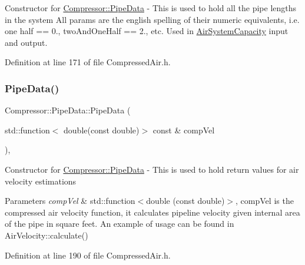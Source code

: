 Constructor for \hyperlink{struct_compressor_1_1_pipe_data}{Compressor\+::\+Pipe\+Data} -\/ This is used to hold all the pipe lengths in the system All params are the english spelling of their numeric equivalents, i.\+e. one half == 0., two\+And\+One\+Half == 2., etc. Used in \hyperlink{class_compressor_1_1_air_system_capacity}{Air\+System\+Capacity} input and output. 

Definition at line 171 of file Compressed\+Air.\+h.

\mbox{\label{struct_compressor_1_1_pipe_data_af7998fd533340b0a84e78fcda91b4806}} 
\subsubsection{\texorpdfstring{Pipe\+Data()}{PipeData()}\hspace{0.1cm}{\footnotesize\ttfamily [2/6]}}
{\footnotesize\ttfamily Compressor\+::\+Pipe\+Data\+::\+Pipe\+Data (\begin{DoxyParamCaption}\item[{std\+::function$<$ double(const double)$>$ const \&}]{comp\+Vel }\end{DoxyParamCaption})\hspace{0.3cm}{\ttfamily [inline]}, {\ttfamily [explicit]}}

Constructor for \hyperlink{struct_compressor_1_1_pipe_data}{Compressor\+::\+Pipe\+Data} -\/ This is used to hold return values for air velocity estimations 
\begin{DoxyParams}{Parameters}
{\em comp\+Vel} & std\+::function$<$double (const double)$>$, comp\+Vel is the compressed air velocity function, it calculates pipeline velocity given internal area of the pipe in square feet. An example of usage can be found in Air\+Velocity\+::calculate() \\
\hline
\end{DoxyParams}


Definition at line 190 of file Compressed\+Air.\+h.

\mbox{\label{struct_compressor_1_1_pipe_data_a71acdc81e25bd90b51361bf8d4f0ed38}} 
